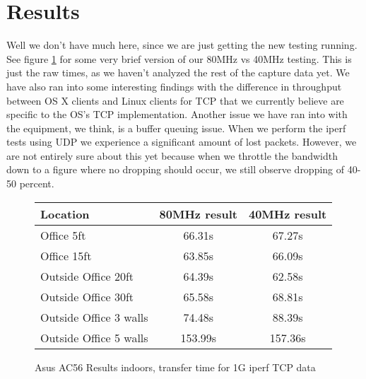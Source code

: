 \section{Results}
Well we don't have much here, since we are just getting the new testing running.
\\
See figure \ref{fig} for some very brief version of our 80MHz vs
40MHz testing. This is just the raw times, as we haven't analyzed the
rest of the capture data yet. We have also ran into some interesting findings
with the difference in throughput between OS X clients and Linux clients for TCP
that we currently believe are specific to the OS's TCP implementation. Another issue
we have ran into with the equipment, we think, is a buffer queuing issue. When we
perform the iperf tests using UDP we experience a significant amount of lost packets.
However, we are not entirely sure about this yet because when we throttle the bandwidth down
to a figure where no dropping should occur, we still observe dropping of 40-50 percent. 

\begin{figure}
\begin{tabular}{| l || c | c |}
\hline
Location & 80MHz result & 40MHz result \\\hline
Office 5ft & 66.31s & 67.27s \\\hline
Office 15ft & 63.85s & 66.09s \\\hline
Outside Office 20ft & 64.39s & 62.58s \\\hline
Outside Office 30ft & 65.58s & 68.81s \\\hline
Outside Office 3 walls & 74.48s & 88.39s \\\hline
Outside Office 5 walls & 153.99s & 157.36s \\ \hline
\end{tabular}
\caption{Asus AC56 Results indoors, transfer time for 1G iperf TCP data}
\label{fig}
\end{figure}
